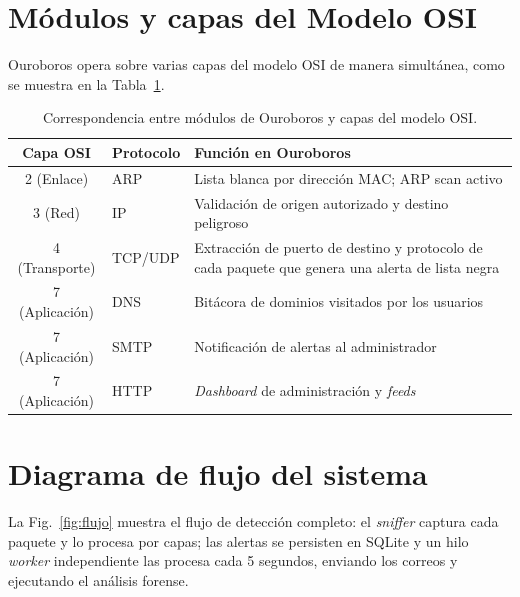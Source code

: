 \documentclass[12pt,letterpaper]{report}
\begin{document}
\section{Módulos y capas del Modelo OSI}

Ouroboros opera sobre varias capas del modelo OSI de manera simultánea, como
se muestra en la Tabla~\ref{tab:osi}.

\begin{table}[H]
\centering
\caption{Correspondencia entre módulos de Ouroboros y capas del modelo OSI.}
\label{tab:osi}
\begin{tabular}{cll}
\toprule
\textbf{Capa OSI} & \textbf{Protocolo} & \textbf{Función en Ouroboros} \\
\midrule
2 (Enlace)     & ARP  & Lista blanca por dirección MAC; ARP scan activo \\
3 (Red)        & IP   & Validación de origen autorizado y destino peligroso \\
4 (Transporte) & TCP/UDP & Extracción de puerto de destino y protocolo de cada
                            paquete que genera una alerta de lista negra \\
7 (Aplicación) & DNS  & Bitácora de dominios visitados por los usuarios \\
7 (Aplicación) & SMTP & Notificación de alertas al administrador \\
7 (Aplicación) & HTTP & \textit{Dashboard} de administración y \textit{feeds} \\
\bottomrule
\end{tabular}
\end{table}

\section{Diagrama de flujo del sistema}

La Fig.~\ref{fig:flujo} muestra el flujo de detección completo: el
\textit{sniffer} captura cada paquete y lo procesa por capas; las alertas se
persisten en SQLite y un hilo \textit{worker} independiente las procesa cada
5 segundos, enviando los correos y ejecutando el análisis forense.
\end{document}
